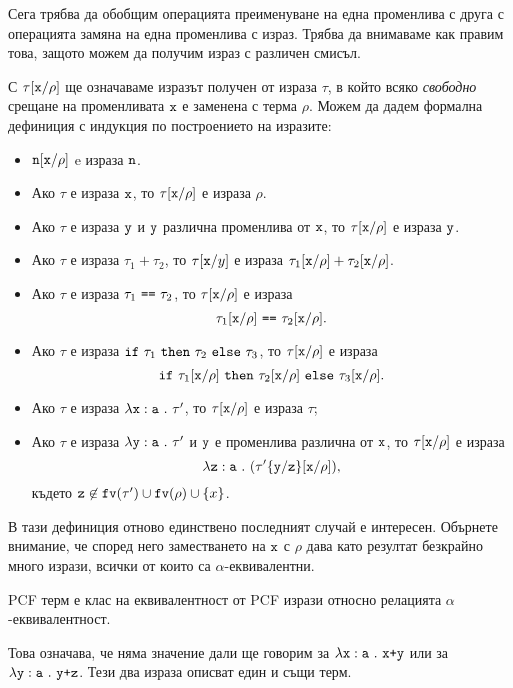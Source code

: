 Сега трябва да обобщим операцията преименуване на една променлива с друга с
операцията замяна на една променлива с израз.
Трябва да внимаваме как правим това, защото можем да получим
израз с различен смисъл.

С $\tau[\texttt{x}/{\rho}]$ ще означаваме изразът получен от израза $\tau$, в който всяко \emph{свободно} срещане на променливата $\texttt{x}$
е заменена с терма $\rho$. Можем да дадем формална дефиниция с индукция по построението на изразите:
\begin{itemize}
\item
  $\texttt{n}[\texttt{x}/{\rho}]$ e израза $\texttt{n}$.
\item
  Ако $\tau$ е израза $\texttt{x}$, то $\tau[\texttt{x}/{\rho}]$ е израза $\rho$.
\item
  Ако $\tau$ е израза $\texttt{y}$ и $\texttt{y}$ различна променлива от $\texttt{x}$, то $\tau[\texttt{x}/{\rho}]$ е израза $\texttt{y}$.
\item
  Ако $\tau$ е израза $\tau_1 + \tau_2$, то
  $\tau[\texttt{x}/{y}]$ е израза $\tau_1[\texttt{x}/{\rho}] + \tau_2[\texttt{x}/{\rho}]$.
\item
  Ако $\tau$ е израза $\tau_1\ \texttt{==}\ \tau_2$, то $\tau[\texttt{x}/{\rho}]$ е израза
  \[\tau_1\subst{x}{\rho}\ \vv{==}\ \tau_2\subst{x}{\rho}.\]
\item
  Ако $\tau$ е израза $\texttt{if}\ \tau_1\ \texttt{then}\ \tau_2\ \texttt{else}\ \tau_3$, то $\tau[\texttt{x}/{\rho}]$ е израза
  \[\texttt{if}\ \tau_1[\texttt{x}/{\rho}]\ \texttt{then}\ \tau_2[\texttt{x}/{\rho}]\ \texttt{else}\ \tau_3[\texttt{x}/{\rho}].\]
\item
  Ако $\tau$ е израза $\lambda\texttt{x}:\texttt{a}\ .\ {\tau'}$, то
  $\tau[\texttt{x}/{\rho}]$ е израза $\tau$;
\item
  Ако $\tau$ е израза $\lambda\texttt{y}:\texttt{a}\ .\ {\tau'}$ и $\texttt{y}$ е променлива различна от $\texttt{x}$, то
  $\tau[\texttt{x}/{\rho}]$ е израза
  \[\lambda\texttt{z}:\texttt{a}\ .\ {(\tau'\{\texttt{y}/\texttt{z}\}[\texttt{x}/{\rho}])},\]
  където $\texttt{z} \not\in \texttt{fv}(\tau') \cup \texttt{fv}(\rho) \cup \{x\}$.
\end{itemize}

В тази дефиниция отново единствено последният случай е интересен.
Обърнете внимание, че според него заместването на $\texttt{x}$ с $\rho$ дава като резултат безкрайно много
изрази, всички от които са $\alpha$-еквивалентни.

\begin{framed}
  PCF терм е клас на еквивалентност от PCF изрази относно релацията $\alpha$-еквивалентност.
\end{framed}

Това означава, че няма значение дали ще говорим за $\lambda\texttt{x}:\texttt{a}\ .\ {\texttt{x+y}}$ или за $\lambda\texttt{y}:\texttt{a}\ .\ {\texttt{y+z}}$.
Тези два израза описват един и същи терм.

